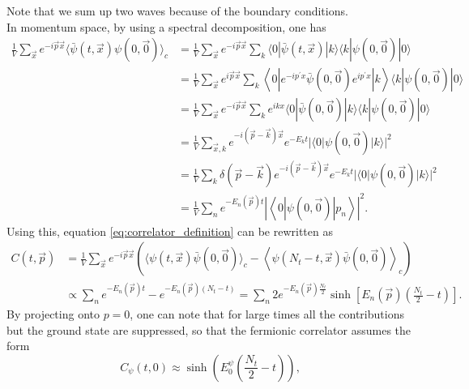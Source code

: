 Note that we sum up two waves because of the boundary conditions. \\
In momentum space, by using a spectral decomposition, one has
\begin{equation*}
    \begin{aligned}
        \frac{1}{V} \sum_{\vec{x}} e^{-i \vec{p} \vec{x}}\langle\bar\psi(t, \vec{x}) \psi(0, \vec{0})\rangle_c & =\frac{1}{V} \sum_{\vec{x}} e^{-i \vec{p} \vec{x}} \sum_k\langle 0|\bar\psi(t, \vec{x})| k\rangle\langle k|\psi(0, \vec{0})| 0\rangle \\
        & =\frac{1}{V} \sum_{\vec{x}} e^{i \vec{p} \vec{x}} \sum_k\left\langle 0\left|e^{-i p^{\prime} x} \bar\psi(0, \vec{0}) e^{i p^{\prime} x}\right| k\right\rangle\langle k|\psi(0, \vec{0})| 0\rangle \\
        & =\frac{1}{V} \sum_{\vec{x}} e^{-i \vec{p} \vec{x}} \sum_k e^{i k x}\langle 0|\bar\psi(0, \vec{0})| k\rangle\langle k|\psi(0, \vec{0})| 0\rangle \\
        & =\frac{1}{V} \sum_{\vec{x}, k} e^{-i(\vec{p}-\vec{k}) \vec{x}} e^{-E_k t}|\langle 0|\psi(0, \vec{0})| k\rangle|^2 \\
        & =\frac{1}{V} \sum_k \delta(\vec{p}-\vec{k}) e^{-i(\vec{p}-\vec{k}) \vec{x}} e^{-E_k t}|\langle 0|\psi(0, \vec{0})| k\rangle|^2 \\
        & =\frac{1}{V} \sum_n e^{-E_n(\vec{p}) t}\left|\left\langle 0|\psi(0, \vec{0})| p_n\right\rangle\right|^2.
        \end{aligned}
\end{equation*}
Using this, equation \ref{eq:correlator_definition} can be rewritten as
\begin{equation*} 
    \begin{aligned}
        C(t, \vec{p}) & =\frac{1}{V} \sum_{\vec{x}} e^{-i \vec{p} \vec{x}}\left(\langle\psi(t, \vec{x}) \bar{\psi}(0, \vec{0})\rangle_c-\left\langle\psi\left(N_t-t, \vec{x}\right) \bar{\psi}(0, \vec{0})\right\rangle_c\right) \\
        & \propto \sum_n e^{-E_n(\vec{p}) t}-e^{-E_n(\vec{p})\left(N_t-t\right)}=\sum_n 2 e^{-E_n(\vec{p}) \frac{N_t}{2}} \sinh \left[E_n(\vec{p})\left(\frac{N_t}{2}-t\right)\right] .
    \end{aligned}
\end{equation*}
By projecting onto $p=0$, one can note that for large times all the contributions but the ground state are suppressed, so that 
the fermionic correlator assumes the form 
\begin{equation}
    C_\psi(t,0) \approx \sinh \left(E_0^{\psi} \left(\frac{N_t}{2} - t\right)\right),
    \label{eq:correlator_func}
\end{equation}

